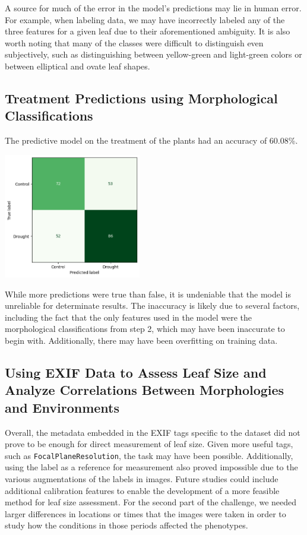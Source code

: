 \documentclass[final,5p,times,twocolumn,authoryear]{elsarticle}
\begin{document}
A source for much of the error in the model's predictions may lie in human error. For example, when labeling data, we may have incorrectly labeled any of the three features for a given leaf due to their aforementioned ambiguity. It is also worth noting that many of the classes were difficult to distinguish even subjectively, such as distinguishing between yellow-green and light-green colors or between elliptical and ovate leaf shapes. 

\subsection{Treatment Predictions using Morphological Classifications}
\label{step_3}

The predictive model on the treatment of the plants had an accuracy of 60.08\%. 

\begin{center}
    \includegraphics[width=0.45\textwidth]{images/treat_conf_matrix.png}
\end{center}

While more predictions were true than false, it is undeniable that the model is unreliable for determinate results. The inaccuracy is likely due to several factors, including the fact that the only features used in the model were the morphological classifications from step 2, which may have been inaccurate to begin with. Additionally, there may have been overfitting on training data.

\subsection{Using EXIF Data to Assess Leaf Size and Analyze Correlations Between Morphologies and Environments}
\label{step_4}

Overall, the metadata embedded in the EXIF tags specific to the dataset did not prove to be enough for direct measurement of leaf size. Given more useful tags, such as \verb|FocalPlaneResolution|, the task may have been possible. Additionally, using the label as a reference for measurement also proved impossible due to the various augmentations of the labels in images. Future studies could include additional calibration features to enable the development of a more feasible method for leaf size assessment. For the second part of the challenge, we needed larger differences in locations or times that the images were taken in order to study how the conditions in those periods affected the phenotypes.
\end{document}
